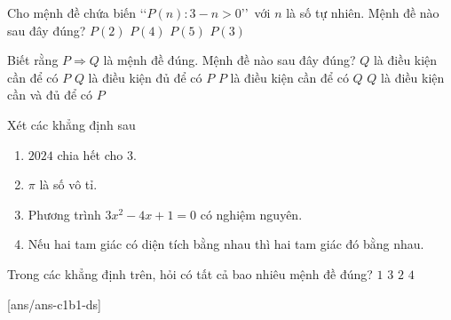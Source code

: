 \begin{ex}%
	Cho mệnh đề chứa biến \lq\lq$P(n) \colon 3 - n > 0$\rq\rq \, với $n$ là số tự nhiên. Mệnh đề nào sau đây đúng?
	\choice
	{\True $P(2)$}
	{$P(4)$}
	{$P(5)$}
	{$P(3)$}
\end{ex}
\begin{ex}%
	Biết rằng $P \Rightarrow Q$ là mệnh đề đúng. Mệnh đề nào sau đây đúng?
	\choice
	{\True $Q$ là điều kiện cần để có $P$}
	{$Q$ là điều kiện đủ để có $P$}
	{$P$ là điều kiện cần để có $Q$}
	{$Q$ là điều kiện cần và đủ để có $P$}
\end{ex}
\begin{ex}%
	Xét các khẳng định sau
	\begin{enumerate}[1)]
		\item $2024$ chia hết cho $3$.
		\item $\pi$ là số vô tỉ.
		\item Phương trình $3x^2-4x+1=0$ có nghiệm nguyên.
		\item Nếu hai tam giác có diện tích bằng nhau thì hai tam giác đó bằng nhau.
	\end{enumerate}
	Trong các khẳng định trên, hỏi có tất cả bao nhiêu mệnh đề đúng?
	\choice
	{$1$}
	{$3$}
	{\True $2$}
	{$4$}
\end{ex}
\TNTF
\setcounter{ex}{0}
[ans/ans-c1b1-ds]
